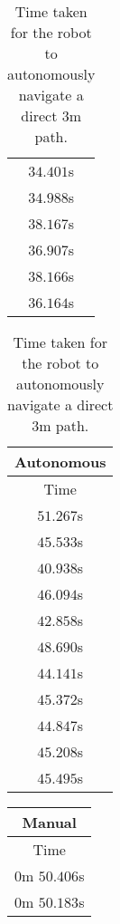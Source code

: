 \begin{appendices}
\begin{table}[!h]
\begin{tabular}{ c }
		$34.401$s \\

		$34.988$s \\

		$38.167$s \\

		$36.907$s \\

		$38.166$s \\

		\midrule
		$36.164$s \\
		\bottomrule
	\end{tabular}
	\hspace{2ex}
	\begin{tabular}{ c }
		\toprule
		\textbf{Autonomous} \\
		\midrule
		Time \\
		\midrule
		$51.267$s \\

		$45.533$s \\

		$40.938$s \\

		$46.094$s \\

		$42.858$s \\

		$48.690$s \\

		$44.141$s \\

		$45.372$s \\

		$44.847$s \\

		$45.208$s \\

		\midrule
		$45.495$s \\
		\bottomrule
	\end{tabular}
	\caption{Time taken for the robot to autonomously navigate a direct $3$m path.}
	\label{tab:eval_nav_dp_wo}
\end{table}

\begin{table}[!h]
	\centering
	\begin{tabular}{ c }
		\toprule
		\textbf{Manual} \\
		\midrule
		Time \\
		\midrule
		$0$m $50.406$s \\

		$0$m $50.183$s \\


\end{tabular}
\end{table}
\end{appendices}
